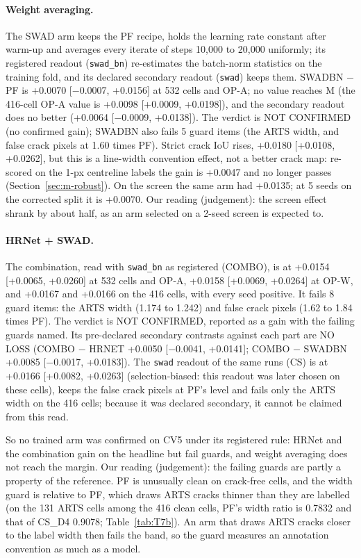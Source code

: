 \paragraph{Weight averaging.} The SWAD arm keeps the PF recipe, holds the learning rate constant after warm-up and averages
every iterate of steps 10,000 to 20,000 uniformly; its registered readout (\texttt{swad\_bn}) re-estimates the batch-norm
statistics on the training fold, and its declared secondary readout (\texttt{swad}) keeps them. SWADBN $-$ PF is +0.0070
[$-$0.0007, +0.0156] at 532 cells and OP-A; no value reaches M (the 416-cell OP-A value is +0.0098 [+0.0009, +0.0198]), and
the secondary readout does no better (+0.0064 [$-$0.0009, +0.0138]). The verdict is NOT CONFIRMED (no confirmed gain); SWADBN
also fails 5 guard items (the ARTS width, and false crack pixels at 1.60 times PF). Strict crack IoU rises, +0.0180 [+0.0108,
+0.0262], but this is a line-width convention effect, not a better crack map: re-scored on the 1-px centreline labels the gain
is +0.0047 and no longer passes (Section~\ref{sec:m-robust}). On the screen the same arm had +0.0135; at 5 seeds on the
corrected split it is +0.0070. Our reading (judgement): the screen effect shrank by about half, as an arm selected on a 2-seed
screen is expected to.

\paragraph{HRNet + SWAD.} The combination, read with \texttt{swad\_bn} as registered (COMBO), is at +0.0154 [+0.0065, +0.0260]
at 532 cells and OP-A, +0.0158 [+0.0069, +0.0264] at OP-W, and +0.0167 and +0.0166 on the 416 cells, with every seed positive.
It fails 8 guard items: the ARTS width (1.174 to 1.242) and false crack pixels (1.62 to 1.84 times PF). The verdict is NOT
CONFIRMED, reported as a gain with the failing guards named. Its pre-declared secondary contrasts against each part are NO LOSS
(COMBO $-$ HRNET +0.0050 [$-$0.0041, +0.0141]; COMBO $-$ SWADBN +0.0085 [$-$0.0017, +0.0183]). The \texttt{swad} readout of the
same runs (CS) is at +0.0166 [+0.0082, +0.0263] (selection-biased: this readout was later chosen on these cells), keeps the false crack pixels at PF's level and fails only the ARTS width on the
416 cells; because it was declared secondary, it cannot be claimed from this read.

So no trained arm was confirmed on CV5 under its registered rule: HRNet and the combination gain on the headline but fail guards,
and weight averaging does not reach the margin. Our reading (judgement): the failing guards are partly a property of the
reference. PF is unusually clean on crack-free cells, and the width guard is relative to PF, which draws ARTS cracks thinner than they
are labelled (on the 131 ARTS cells among the 416 clean cells, PF's width ratio is 0.7832 and that of CS\_D4 0.9078;
Table~\ref{tab:T7b}). An arm
that draws ARTS cracks closer to the label width then fails the band, so the guard measures an annotation convention as much as a
model.

